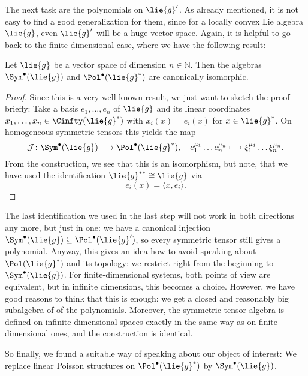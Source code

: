 The next task are the polynomials on $\lie{g}'$. As already mentioned, it is 
not easy to find a good generalization for them, since for a locally convex 
Lie algebra $\lie{g}$, even $\lie{g}'$ will be a huge vector space. 
Again, it is helpful to go back to the finite-dimensional case, where we have 
the following result:
\begin{proposition}
	\label{Alg:Prop:PolIsSym}
	Let $\lie{g}$ be a vector space of dimension $n \in \mathbb{N}$. Then 
	the algebras $\Sym^{\bullet}(\lie{g})$ and $\Pol^{\bullet}(\lie{g}^*)$ 
	are canonically isomorphic.
\end{proposition}
\begin{proof}
	Since this is a very well-known result, we just want to sketch the proof 
	briefly: Take a basis $e_1, \ldots, e_n$ of $\lie{g}$ and its linear 
	coordinates $x_1, \ldots, x_n \in \Cinfty(\lie{g}^*)$ with $x_i(x) = 
	e_i(x)$ for $x \in \lie{g}^*$. On homogeneous symmetric tensors this 
	yields the map
	\begin{equation*}
		\mathcal{J}
		\colon
		\Sym^{\bullet}(\lie{g})
		\longrightarrow
		\Pol^{\bullet}(\lie{g}^*),
		\quad
		e_1^{\mu_1} \ldots e_n^{\mu_n}
		\longmapsto
		\xi_1^{\mu_1} \ldots \xi_n^{\mu_n}.
	\end{equation*}
	From the construction, we see that this is an isomorphism, but note, that 
	we have used the identification $\lie{g}^{**} \cong \lie{g}$ via
	\begin{equation*}
		e_i(x)
		=
		\langle x, e_i \rangle.
	\end{equation*}
\end{proof}
The last identification we used in the last step will not work in both
directions any more, but just in one: we have a canonical injection
$\Sym^{\bullet}(\lie{g}) \subseteq \Pol^{\bullet}(\lie{g}')$, so every 
symmetric tensor still gives a polynomial. Anyway, this gives an idea 
how to avoid speaking about $\Pol(\lie{g}^*)$ and its topology: we 
restrict right from the beginning to $\Sym^{\bullet}(\lie{g})$.
For finite-dimensional systems, both points of view are equivalent,
but in infinite dimensions, this becomes a choice. However,
we have good reasons to think that this is enough: we get a closed 
and reasonably big subalgebra of of the polynomials. Moreover, 
the symmetric tensor algebra is defined on infinite-dimensional spaces 
exactly in the same way as on finite-dimensional ones,  and the 
construction is identical. 

So finally, we found a suitable way of speaking about our object of interest: 
We replace linear Poisson structures on $\Pol^{\bullet}(\lie{g}^*)$ by 
$\Sym^{\bullet}(\lie{g})$. 





